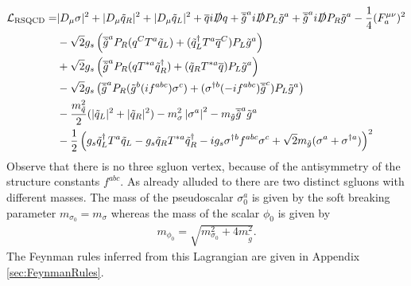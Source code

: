 \begin{align}
\mathcal{L}_{\mathrm{RSQCD}} = & |D_\mu \sigma|^2 + |D_\mu \tilde{q}_R|^2 + |D_\mu \tilde{q}_L|^2 + \overline{q}i\slashed{D}q + \overline{\tilde{g}}^ai\slashed{D}P_L\tilde{g}^a + \overline{\tilde{g}}^ai\slashed{D}P_R\tilde{g}^a - \frac{1}{4} (F_a^{\mu\nu})^2\nonumber\\
& -\sqrt{2}g_s \left( \overline{\tilde{g}}^a P_R (q^C T^a \tilde{q}_L) + (\tilde{q}_L^\dagger T^a \overline{q}^C)P_L\tilde{g}^a \right)\nonumber\\
& +\sqrt{2}g_s \left( \overline{\tilde{g}}^a P_R (q T^{\ast a} \tilde{q}_R^\dagger) + (\tilde{q}_R T^{\ast a} \overline{q})P_L\tilde{g}^a \right) \nonumber\\
& -\sqrt{2}g_s \left( \overline{\tilde{g}}^a P_R (\tilde{g}^b (if^{abc}) \sigma^c) + (\sigma^{\dagger b} (-if^{abc}) \overline{\tilde{g}}^c)P_L\tilde{g}^a \right) \nonumber\\
& -\frac{m_{\tilde{q}}^2}{2}(|\tilde{q}_L|^2 + |\tilde{q}_R|^2) -m_{\sigma}^2\left|\sigma^a\right|^2  - m_{\tilde{g}} \overline{\tilde{g}}^a\tilde{g}^a\nonumber\\
& -\frac{1}{2}\left( g_s \tilde{q}_L^\dagger T^a \tilde{q}_L - g_s \tilde{q}_R T^{\ast a} \tilde{q}_R^\dagger - ig_s\sigma^{\dagger b}f^{abc}\sigma^c + \sqrt{2}m_{\tilde{g}}(\sigma^a + \sigma^{\dagger a}) \right)^2\label{eq:L_RSQCD}
\end{align}
Observe that there is no three sgluon vertex, because of the antisymmetry of the structure constants $f^{abc}$. As already alluded to there are two distinct sgluons with different masses. The mass of the pseudoscalar $\sigma_0^a$ is given by the soft breaking parameter $m_{\sigma_0} = m_\sigma$ whereas the mass of the scalar $\phi_0$ is given by 
\begin{align}
m_{\phi_0} = \sqrt{m_{\sigma_0}^2 + 4 m_{\tilde{g}}^2}.
\end{align}
The Feynman rules inferred from this Lagrangian are given in Appendix \ref{sec:FeynmanRules}.
\newpage
